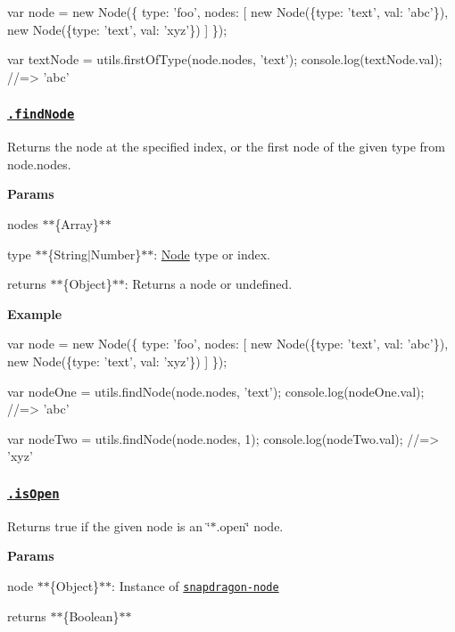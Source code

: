 \begin{DoxyCode}
var node = new Node(\{
  type: 'foo',
  nodes: [
    new Node(\{type: 'text', val: 'abc'\}),
    new Node(\{type: 'text', val: 'xyz'\})
  ]
\});

var textNode = utils.firstOfType(node.nodes, 'text');
console.log(textNode.val);
//=> 'abc'
\end{DoxyCode}


\subsubsection*{\href{index.js#L556}{\tt .find\+Node}}

Returns the node at the specified index, or the first node of the given {\ttfamily type} from {\ttfamily node.\+nodes}.

{\bfseries Params}


\begin{DoxyItemize}
\item {\ttfamily nodes} $\ast$$\ast$\{Array\}$\ast$$\ast$
\item {\ttfamily type} $\ast$$\ast$\{String$\vert$\+Number\}$\ast$$\ast$\+: \mbox{\hyperlink{classNode}{Node}} type or index.
\item {\ttfamily returns} $\ast$$\ast$\{Object\}$\ast$$\ast$\+: Returns a node or undefined.
\end{DoxyItemize}

{\bfseries Example}


\begin{DoxyCode}
var node = new Node(\{
  type: 'foo',
  nodes: [
    new Node(\{type: 'text', val: 'abc'\}),
    new Node(\{type: 'text', val: 'xyz'\})
  ]
\});

var nodeOne = utils.findNode(node.nodes, 'text');
console.log(nodeOne.val);
//=> 'abc'

var nodeTwo = utils.findNode(node.nodes, 1);
console.log(nodeTwo.val);
//=> 'xyz'
\end{DoxyCode}


\subsubsection*{\href{index.js#L584}{\tt .is\+Open}}

Returns true if the given node is an \char`\"{}$\ast$.\+open\char`\"{} node.

{\bfseries Params}


\begin{DoxyItemize}
\item {\ttfamily node} $\ast$$\ast$\{Object\}$\ast$$\ast$\+: Instance of \href{https://github.com/jonschlinkert/snapdragon-node}{\tt snapdragon-\/node}
\item {\ttfamily returns} $\ast$$\ast$\{Boolean\}$\ast$$\ast$
\end{DoxyItemize}

